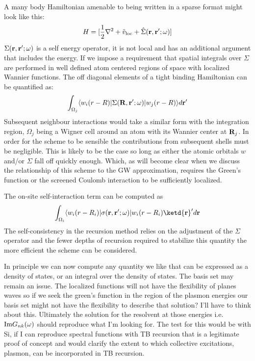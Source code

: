 \documentclass{article}
\def\ket{\rangle}
\def\bra{\langle}
\def\r{{\bf r}}
\def\R{{\bf R}}
\begin{document}
A many body Hamiltonian amenable to being written in a sparse format might look like this:
%
\begin{equation}
H = [\frac{1}{2}\nabla^{2} + \tilde{v}_{\rm loc} + \hat{\Sigma}(\r,\r';\omega)]
\end{equation}
%
	$\Sigma(\r,\r';\omega)$ is a self energy operator, it is not local and 
has an additional argument that includes the energy.
If we impose a requirement that spatial integrals over $\Sigma$ are performed in 
well defined atom centered regions of space with localized Wannier functions. 
The off diagonal elements of a tight binding Hamiltonian can be quantified as:
%
\begin{equation}
\int_{\Omega_{j}}\bra w_{i}(r-R)|\Sigma(\R,\r';\omega)|w_{j}(r-R)\ket d\r'
\end{equation}
%
	Subsequent neighbour interactions would take a similar form
with the integration region, $\Omega_{j}$ being a Wigner cell around an 
atom with its Wannier center at $\R_j$. In order for the scheme to be sensible the contributions from subsequent shells 
must be negligible. This is likely to be the case so long as either the atomic orbitals $w$ and/or $\Sigma$ 
fall off quickly enough. Which, as will become clear when we discuss
the relationship of this scheme to the GW approximation, requires 
the Green's function or the screened Coulomb interaction to be sufficiently localized.

The on-site self-interaction term can be computed as
%
\begin{equation}
\int_{\Omega_{i}}\bra w_{i}(r-R_{i})|\sigma(\r,\r';\omega)|w_{i}(r-R_{i})\ketd\r'd\r
\end{equation}
%
The self-consistency in the recursion method relies on the adjustment of the $\Sigma$ operator 
and the fewer depths of recursion required to stabilize this quantity the more efficient the
scheme can be considered.

In principle we can now compute any quantity we like that can be expressed
as a density of states, or an integral over the density of states.
The basis set may remain an issue. The localized functions will not have the 
flexibility of planes waves so if we seek the green's function in the 
region of the plasmon energies our basis set might not have the flexibility 
to describe that solution? I'll have to think about this. Ultimately the 
solution for the resolvent at those energies i.e. ${\rm Im} G_{nk}(\omega)$ should 
reproduce what I'm looking for. The test for this would be with Si, if 
I can reproduce spectral functions with TB recursion that is a legitimate 
proof of concept and would clarify the extent to which collective excitations,
plasmon, can be incorporated in TB recursion. 
\end{document}
